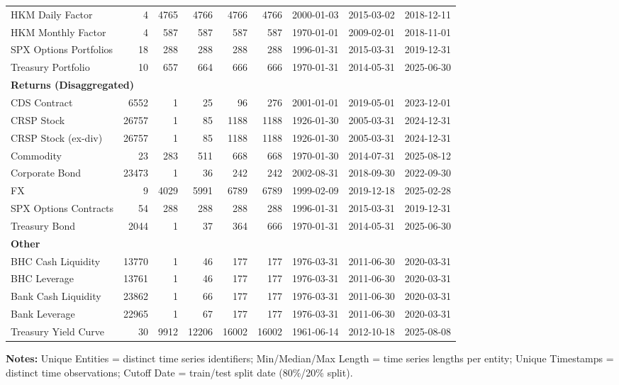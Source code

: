 \begin{table}[htbp]
\begin{tabular}{@{}lrrrrrlll@{}}
HKM Daily Factor & 4 & 4765 & 4766 & 4766 & 4766 & 2000-01-03 & 2015-03-02 & 2018-12-11 \\
HKM Monthly Factor & 4 & 587 & 587 & 587 & 587 & 1970-01-01 & 2009-02-01 & 2018-11-01 \\
SPX Options Portfolios & 18 & 288 & 288 & 288 & 288 & 1996-01-31 & 2015-03-31 & 2019-12-31 \\
Treasury Portfolio & 10 & 657 & 664 & 666 & 666 & 1970-01-31 & 2014-05-31 & 2025-06-30 \\
\midrule
\multicolumn{9}{l}{\textbf{Returns (Disaggregated)}} \\
CDS Contract & 6552 & 1 & 25 & 96 & 276 & 2001-01-01 & 2019-05-01 & 2023-12-01 \\
CRSP Stock & 26757 & 1 & 85 & 1188 & 1188 & 1926-01-30 & 2005-03-31 & 2024-12-31 \\
CRSP Stock (ex-div) & 26757 & 1 & 85 & 1188 & 1188 & 1926-01-30 & 2005-03-31 & 2024-12-31 \\
Commodity & 23 & 283 & 511 & 668 & 668 & 1970-01-30 & 2014-07-31 & 2025-08-12 \\
Corporate Bond & 23473 & 1 & 36 & 242 & 242 & 2002-08-31 & 2018-09-30 & 2022-09-30 \\
FX & 9 & 4029 & 5991 & 6789 & 6789 & 1999-02-09 & 2019-12-18 & 2025-02-28 \\
SPX Options Contracts & 54 & 288 & 288 & 288 & 288 & 1996-01-31 & 2015-03-31 & 2019-12-31 \\
Treasury Bond & 2044 & 1 & 37 & 364 & 666 & 1970-01-31 & 2014-05-31 & 2025-06-30 \\
\midrule
\multicolumn{9}{l}{\textbf{Other}} \\
BHC Cash Liquidity & 13770 & 1 & 46 & 177 & 177 & 1976-03-31 & 2011-06-30 & 2020-03-31 \\
BHC Leverage & 13761 & 1 & 46 & 177 & 177 & 1976-03-31 & 2011-06-30 & 2020-03-31 \\
Bank Cash Liquidity & 23862 & 1 & 66 & 177 & 177 & 1976-03-31 & 2011-06-30 & 2020-03-31 \\
Bank Leverage & 22965 & 1 & 67 & 177 & 177 & 1976-03-31 & 2011-06-30 & 2020-03-31 \\
Treasury Yield Curve & 30 & 9912 & 12206 & 16002 & 16002 & 1961-06-14 & 2012-10-18 & 2025-08-08 \\
\bottomrule
\end{tabular}
\vspace{0.1cm}
\begin{minipage}{\textwidth}
\scriptsize
\textbf{Notes:} Unique Entities = distinct time series identifiers; Min/Median/Max Length = time series lengths per entity; Unique Timestamps = distinct time observations; Cutoff Date = train/test split date (80\%/20\% split).
\end{minipage}
\end{table}